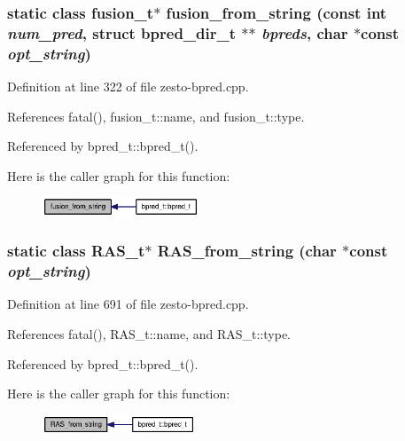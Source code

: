 \subsubsection[{fusion\_\-from\_\-string}]{\setlength{\rightskip}{0pt plus 5cm}static class {\bf fusion\_\-t}$\ast$ fusion\_\-from\_\-string (const int {\em num\_\-pred}, \/  struct {\bf bpred\_\-dir\_\-t} $\ast$$\ast$ {\em bpreds}, \/  char $\ast$const  {\em opt\_\-string})\hspace{0.3cm}{\tt  [static]}}\label{zesto-bpred_8cpp_3d7431d962d5081ca01c1f7e9fa8597a}




Definition at line 322 of file zesto-bpred.cpp.

References fatal(), fusion\_\-t::name, and fusion\_\-t::type.

Referenced by bpred\_\-t::bpred\_\-t().

Here is the caller graph for this function:\nopagebreak
\begin{figure}[H]
\begin{center}
\leavevmode
\includegraphics[width=132pt]{zesto-bpred_8cpp_3d7431d962d5081ca01c1f7e9fa8597a_icgraph}
\end{center}
\end{figure}
\subsubsection[{RAS\_\-from\_\-string}]{\setlength{\rightskip}{0pt plus 5cm}static class {\bf RAS\_\-t}$\ast$ RAS\_\-from\_\-string (char $\ast$const  {\em opt\_\-string})\hspace{0.3cm}{\tt  [static]}}\label{zesto-bpred_8cpp_c78e01bd525dcb134accdf21531b9489}




Definition at line 691 of file zesto-bpred.cpp.

References fatal(), RAS\_\-t::name, and RAS\_\-t::type.

Referenced by bpred\_\-t::bpred\_\-t().

Here is the caller graph for this function:\nopagebreak
\begin{figure}[H]
\begin{center}
\leavevmode
\includegraphics[width=129pt]{zesto-bpred_8cpp_c78e01bd525dcb134accdf21531b9489_icgraph}
\end{center}
\end{figure}

